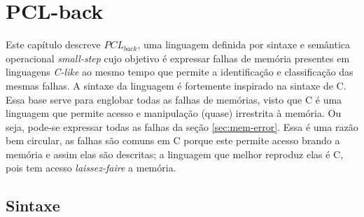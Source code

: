 \chapter{PCL-back}
\label{chap3}


Este capítulo descreve $PCL_{back}$, uma linguagem definida por sintaxe e semântica operacional \emph{small-step} cujo objetivo é expressar falhas de memória presentes em linguagens \emph{C-like} ao mesmo tempo que permite a identificação e classificação das mesmas falhas. A sintaxe da linguagem é fortemente inspirado na sintaxe de C. Essa base serve para englobar todas as falhas de memórias, visto que C é uma linguagem que permite acesso e manipulação (quase) irrestrita à memória. Ou seja, pode-se expressar todas as falhas da seção \ref{sec:mem-error}. Essa é uma razão bem circular, as falhas são comuns em C porque este permite acesso brando a memória e assim elas são descritas; a linguagem que melhor reproduz elas é C, pois tem acesso \emph{laissez-faire} a memória.


\section{Sintaxe}

